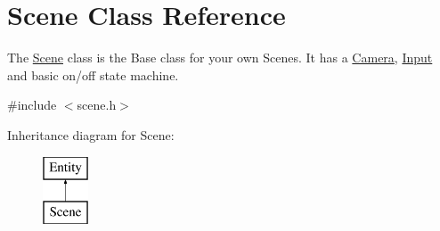 \hypertarget{class_scene}{}\section{Scene Class Reference}
\label{class_scene}


The \hyperlink{class_scene}{Scene} class is the Base class for your own Scenes. It has a \hyperlink{class_camera}{Camera}, \hyperlink{class_input}{Input} and basic on/off state machine.  




{\ttfamily \#include $<$scene.\+h$>$}

Inheritance diagram for Scene\+:\begin{figure}[H]
\begin{center}
\leavevmode
\includegraphics[height=2.000000cm]{class_scene}
\end{center}
\end{figure}

